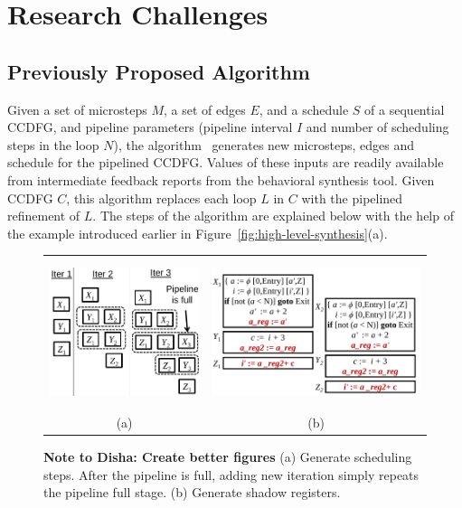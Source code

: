 \chapter{Research Challenges}
\label{sec:challenges}

\section{Previously Proposed Algorithm}
\label{subsec:kecheng's algorithm}

\noindent
Given a set of microsteps $M$, a set of edges $E$, and a schedule $S$ of a
sequential CCDFG, and pipeline parameters (pipeline
interval $I$ and number of scheduling steps in the loop
$N$), the algorithm~\cite{hrx:dac-12} generates new microsteps, edges and
schedule for the pipelined CCDFG. Values of these inputs are readily available from
intermediate feedback reports from the behavioral synthesis
tool. Given CCDFG $C$, this algorithm replaces
each loop $L$ in $C$ with the pipelined refinement of
$L$. The steps of the algorithm are explained below with the
help of the example introduced earlier in Figure~\ref{fig:high-level-synthesis}(a).

\begin{figure}
\begin{center}
\begin{tabular}{cc}
\includegraphics[height=1.7in]{fig-proposal/generate-scheduling-steps}
& %
\includegraphics[height=1.7in]{fig-proposal/shadow-reg}
\\
(a) & (b)
\end{tabular}
\end{center}
\caption{{\bf Note to Disha: Create better figures} (a) Generate scheduling steps. After the pipeline is full, adding new iteration simply repeats the pipeline full stage. (b) Generate shadow registers.}
\label{fig:algorithm}
\end{figure}

